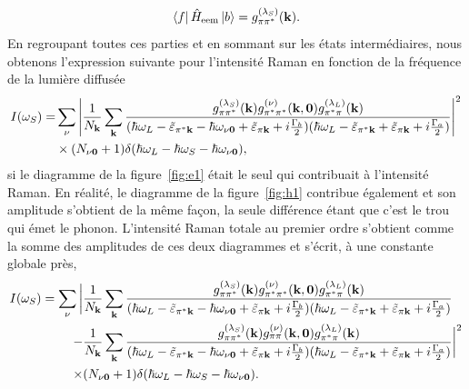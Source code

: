 \begin{equation}
    \bra{f}\hat{H}_\text{eem}\ket{b} = g_{\pi\pi^*}^{(\lambda_S)}(\mathbf{k}).
\end{equation}
En regroupant toutes ces parties et en sommant sur les états intermédiaires, nous obtenons l'expression suivante pour l'intensité Raman en fonction de la fréquence de la lumière diffusée
\begin{equation}
    \begin{split}
    I(\omega_S) = &\sum_{\nu}\left|\frac{1}{N_{\mathbf{k}}}\sum_{\mathbf{k}}\frac{g_{\pi\pi^*}^{(\lambda_S)}(\mathbf{k})g_{\pi^*\pi^*}^{(\nu)}(\mathbf{k},\bm 0)g_{\pi^*\pi}^{(\lambda_L)}(\mathbf{k})}{(\hbar\omega_L-\tilde{\varepsilon}_{\pi^*\mathbf{k}}-\hbar\omega_{\nu\bm 0}+\tilde{\varepsilon}_{\pi\mathbf{k}}+i\frac{\Gamma_b}{2})(\hbar\omega_L-\tilde{\varepsilon}_{\pi^*\mathbf{k}}+\tilde{\varepsilon}_{\pi\mathbf{k}}+i\frac{\Gamma_a}{2})}\right|^2\\
    &\times(N_{\nu\bm 0}+1)\delta(\hbar\omega_L-\hbar\omega_S-\hbar\omega_{\nu\bm 0}),
    \end{split}
\end{equation}
si le diagramme de la figure~\ref{fig:e1} était le seul qui contribuait à l'intensité Raman. En réalité, le diagramme de la figure~\ref{fig:h1} contribue également et son amplitude s'obtient de la même façon, la seule différence étant que c'est le trou qui émet le phonon. L'intensité Raman totale au premier ordre s'obtient comme la somme des amplitudes de ces deux diagrammes et s'écrit, à une constante globale près,
\begin{equation}
    \begin{split}
        I(\omega_S) = \sum_\nu\bigg\rvert&\frac{1}{N_{\mathbf{k}}}\sum_{\mathbf{k}}\frac{g_{\pi\pi^*}^{(\lambda_S)}(\mathbf{k})g_{\pi^*\pi^*}^{(\nu)}(\mathbf{k},\bm 0)g_{\pi^*\pi}^{(\lambda_L)}(\mathbf{k})}{(\hbar\omega_L-\tilde{\varepsilon}_{\pi^*\mathbf{k}}-\hbar\omega_{\nu\bm 0}+\tilde{\varepsilon}_{\pi\mathbf{k}}+i\frac{\Gamma_b}{2})(\hbar\omega_L-\tilde{\varepsilon}_{\pi^*\mathbf{k}}+\tilde{\varepsilon}_{\pi\mathbf{k}}+i\frac{\Gamma_a}{2})}\\
        -&\frac{1}{N_{\mathbf{k}}}\sum_{\mathbf{k}}\frac{g_{\pi\pi^*}^{(\lambda_S)}(\mathbf{k})g_{\pi\pi}^{(\nu)}(\mathbf{k},\bm 0)g_{\pi^*\pi}^{(\lambda_L)}(\mathbf{k})}{(\hbar\omega_L-\tilde{\varepsilon}_{\pi^*\mathbf{k}}-\hbar\omega_{\nu\bm 0}+\tilde{\varepsilon}_{\pi\mathbf{k}}+i\frac{\Gamma_b}{2})(\hbar\omega_L-\tilde{\varepsilon}_{\pi^*\mathbf{k}}+\tilde{\varepsilon}_{\pi\mathbf{k}}+i\frac{\Gamma_a}{2})}\bigg\rvert^2\\
        \times&(N_{\nu\bm 0}+1)\delta(\hbar\omega_L-\hbar\omega_S-\hbar\omega_{\nu\bm 0}).\label{eqn:I_1phonon}
    \end{split}
\end{equation}
